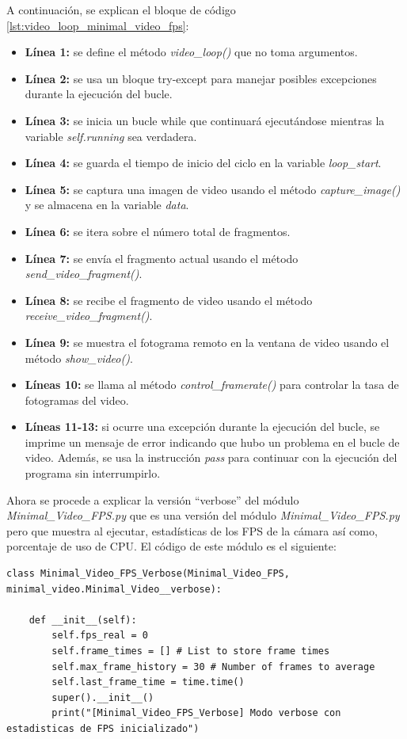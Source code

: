 A continuación, se explican el bloque de código \ref{lst:video_loop_minimal_video_fps}:

\begin{itemize}
    \item \textbf{Línea 1:} se define el método \textit{video\_loop()} que no toma argumentos.
    \item \textbf{Línea 2:} se usa un bloque try-except para manejar posibles excepciones durante la ejecución del bucle.
    \item \textbf{Línea 3:} se inicia un bucle while que continuará ejecutándose mientras la variable \textit{self.running} sea verdadera.
    \item \textbf{Línea 4:} se guarda el tiempo de inicio del ciclo en la variable \textit{loop\_start}.
    \item \textbf{Línea 5:} se captura una imagen de video usando el método \textit{capture\_image()} y se almacena en la variable \textit{data}.
    \item \textbf{Línea 6:} se itera sobre el número total de fragmentos.
    \item \textbf{Línea 7:} se envía el fragmento actual usando el método \textit{send\_video\_fragment()}.
    \item \textbf{Línea 8:} se recibe el fragmento de video usando el método \textit{receive\_video\_fragment()}.
    \item \textbf{Línea 9:} se muestra el fotograma remoto en la ventana de video usando el método \textit{show\_video()}.
    \item \textbf{Líneas 10:} se llama al método \textit{control\_framerate()} para controlar la tasa de fotogramas del video.
    \item \textbf{Líneas 11-13:} si ocurre una excepción durante la ejecución del bucle, se imprime un mensaje de error indicando que hubo un problema en el bucle de video. Además, se usa la instrucción \textit{pass} para continuar con la ejecución del programa sin interrumpirlo.
\end{itemize}
\vspace{\baselineskip}

Ahora se procede a explicar la versión ``verbose'' del módulo \textit{Minimal\_Video\_FPS.py} que es una versión del módulo \textit{Minimal\_Video\_FPS.py} pero que muestra al ejecutar, estadísticas de los FPS de la cámara así como, porcentaje de uso de CPU. El código de este módulo es el siguiente:
\begin{lstlisting}[style=pythonstyle, caption={Comienzo del módulo Minimal\_Video\_FPS\_Verbose.py y su inicialización}, label={lst:comienzo_minimal_video_fps_verbose}]
class Minimal_Video_FPS_Verbose(Minimal_Video_FPS, minimal_video.Minimal_Video__verbose):

    def __init__(self):
        self.fps_real = 0
        self.frame_times = [] # List to store frame times
        self.max_frame_history = 30 # Number of frames to average
        self.last_frame_time = time.time() 
        super().__init__()
        print("[Minimal_Video_FPS_Verbose] Modo verbose con estadisticas de FPS inicializado")
\end{lstlisting}
\vspace{\baselineskip}

